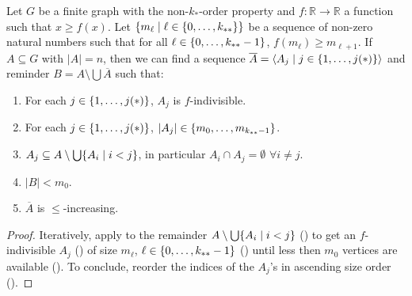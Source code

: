     \begin{lemma}[Claim 4.4 + 4.5] \label{lem:existance_of_ordered_f_indivisible_partitions}
        Let $G$ be a finite graph with the non-$k_{*}$-order property and $f: \mathbb{R} \longrightarrow \mathbb{R}$ a function
        such that $x \geq f(x)$.
        Let $\{ m_\ell \mid \ell \in \{ 0, \dots, k_{**} \} \}$ be a sequence of non-zero natural numbers such that
        for all $\ell \in \{ 0, \dots, k_{**}-1 \}$, $f(m_{\ell}) \geq m_{\ell+1}$.
        If $A \subseteq G$ with $|A| = n$, then we can find a sequence $\overline{A} = \left< A_j \mid j \in \{ 1, \dots, j(*) \} \right>$
        and reminder $B = A \setminus \bigcup \overline{A}$ such that:
        \begin{enumerate}
            \item \label{itm:existance_of_ordered_f_indivisible_partitions.1} For each $j \in \{ 1, \dots, j(*) \}$, $A_j$ is $f$-indivisible.
            \item \label{itm:existance_of_ordered_f_indivisible_partitions.2} For each $j \in \{ 1, \dots, j(*) \}$, $|A_j| \in \{ m_0, \dots, m_{k_{**}-1} \}$.
            \item \label{itm:existance_of_ordered_f_indivisible_partitions.3} $A_j \subseteq A \setminus \bigcup\{ A_i \mid i < j \}$, in particular $A_i \cap A_j = \emptyset$ $\forall i \neq j$.
            \item \label{itm:existance_of_ordered_f_indivisible_partitions.4} $|B| < m_0$.
            \item \label{itm:existance_of_ordered_f_indivisible_partitions.5} $\overline{A}$ is $\leq$-increasing.
        \end{enumerate}
        \begin{proof}
            Iteratively, apply  to the remainder $A \setminus \bigcup \{ A_i \mid i < j \}$
            () to get an $f$-indivisible $A_j$ () of size $m_\ell$, $\ell \in \{ 0, \dots, k_{**}-1 \}$
            () until less then $m_0$ vertices are available ().
            To conclude, reorder the indices of the $A_j$'s in ascending size order ().
        \end{proof}
    \end{lemma}

